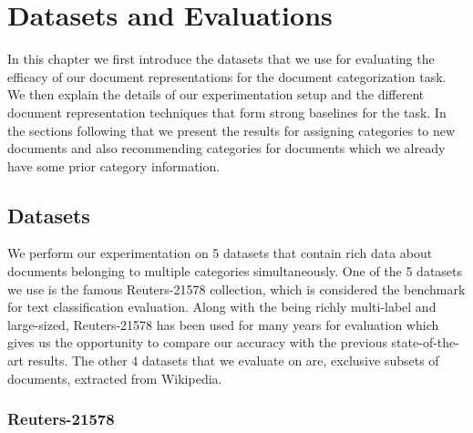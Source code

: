 \chapter{Datasets and Evaluations}
\label{chapter:evaluations}





In this chapter we first introduce the datasets that we use for evaluating the efficacy of our document representations for the document categorization task. We then explain the details of our experimentation setup and the different document representation techniques that form strong baselines for the task. In the sections following that we present the results for assigning categories to new documents and also recommending categories for documents which we already have some prior category information. 

\section{Datasets}
We perform our experimentation on 5 datasets that contain rich data about documents belonging to multiple categories simultaneously. One of the 5 datasets we use is the famous Reuters-21578 collection, which is considered the benchmark for text classification evaluation. Along with the being richly multi-label and large-sized, Reuters-21578 has been used for many years for evaluation which gives us the opportunity to compare our accuracy with the previous state-of-the-art results. The other 4 datasets that we evaluate on are, exclusive subsets of documents, extracted from Wikipedia.

\subsection{Reuters-21578}






